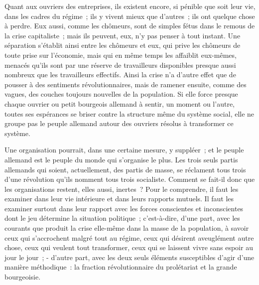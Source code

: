 \documentclass[french,twoside]{book} %
\begin{document}
Quant aux ouvriers des entreprises, ils existent encore, si pénible que soit leur vie, dans les cadres du régime ; ils y vivent mieux que d'autres ; ils ont quelque chose à perdre. Eux aussi, comme les chômeurs, sont de simples fétus dans le remous de la crise capitaliste ; mais ils peuvent, eux, n'y pas penser à tout instant. Une séparation s'établit ainsi entre les chômeurs et eux, qui prive les chômeurs de toute prise sur l'économie, mais qui en même temps les affaiblit eux-mêmes, menacés qu'ils sont par une réserve de travailleurs disponibles presque aussi nombreux que les travailleurs effectifs. Ainsi la crise n'a d'autre effet que de pousser à des sentiments révolutionnaires, mais de ramener ensuite, comme des vagues, des couches toujours nouvelles de la population. Si elle force presque chaque ouvrier ou petit bourgeois allemand à sentir, un moment ou l'autre, toutes ses espérances se briser contre la structure même du système social, elle ne groupe pas le peuple allemand autour des ouvriers résolus à transformer ce système.\par
Une organisation pourrait, dans une certaine mesure, y suppléer ; et le peuple allemand est le peuple du monde qui s'organise le plus. Les trois seuls partis allemands qui soient, actuellement, des partis de masse, se réclament tous trois d'une révolution qu'ils nomment tous trois socialiste. Comment se fait-il donc que les organisations restent, elles aussi, inertes ? Pour le comprendre, il faut les examiner dans leur vie intérieure et dans leurs rapports mutuels. Il faut les examiner surtout dans leur rapport avec les forces con­scientes et inconscientes dont le jeu détermine la situation politique ; c'est-à-dire, d'une part, avec les courants que produit la crise elle-même dans la masse de la population, à savoir ceux qui s'accrochent malgré tout au régime, ceux qui désirent aveuglément autre chose, ceux qui veulent tout transformer, ceux qui se laissent vivre sans espoir au jour le jour ; - d'autre part, avec les deux seuls éléments susceptibles d'agir d'une manière méthodique : la fraction révolutionnaire du prolétariat et la grande bourgeoisie.\par
\end{document}
